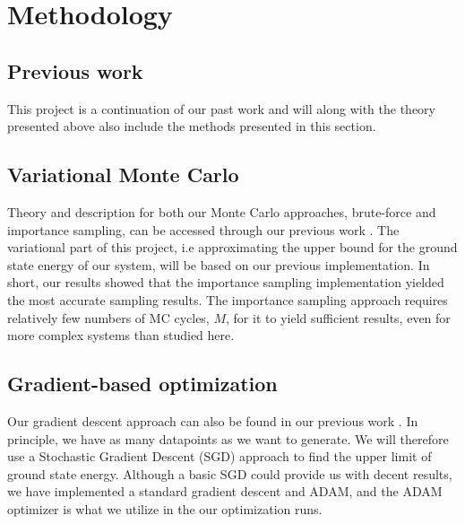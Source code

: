 \section{Methodology}\label{sec:Method}

\subsection{Previous work}\label{sec:project method}
This project is a continuation of our past work \citep{project1} and will along with the theory presented above also include the methods presented in this section.

\subsection{Variational Monte Carlo}
Theory and description for both our Monte Carlo approaches, brute-force and importance sampling, can be accessed through our previous work \citep{project1}. The variational part of this project, i.e approximating the upper bound for the ground state energy of our system, will be based on our previous implementation. In short, our results showed that the importance sampling implementation yielded the most accurate sampling results. The importance sampling approach requires relatively few numbers of MC cycles, $M$, for it to yield sufficient results, even for more complex systems than studied here. 

\subsection{Gradient-based optimization}

Our gradient descent approach can also be found in our previous work \citep{project1}. In principle, we have as many datapoints as we want to generate. We will therefore use a Stochastic Gradient Descent (SGD) approach to find the upper limit of ground state energy. Although a basic SGD could provide us with decent results, we have implemented a standard gradient descent and ADAM, and the ADAM optimizer is what we utilize in the our optimization runs. 

